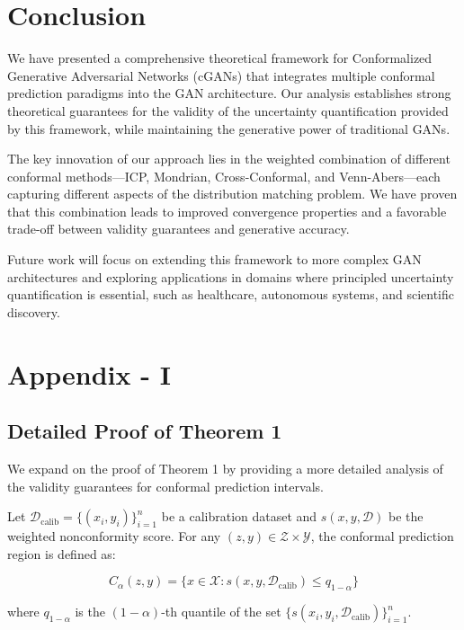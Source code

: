 \documentclass{article}
\theoremstyle{plain}
\theoremstyle{definition}
\theoremstyle{remark}
\begin{document}
\section{Conclusion}
We have presented a comprehensive theoretical framework for Conformalized Generative Adversarial Networks (cGANs) that integrates multiple conformal prediction paradigms into the GAN architecture. Our analysis establishes strong theoretical guarantees for the validity of the uncertainty quantification provided by this framework, while maintaining the generative power of traditional GANs.

The key innovation of our approach lies in the weighted combination of different conformal methods—ICP, Mondrian, Cross-Conformal, and Venn-Abers—each capturing different aspects of the distribution matching problem. We have proven that this combination leads to improved convergence properties and a favorable trade-off between validity guarantees and generative accuracy.

Future work will focus on extending this framework to more complex GAN architectures and exploring applications in domains where principled uncertainty quantification is essential, such as healthcare, autonomous systems, and scientific discovery.

\section{Appendix - I}

\subsection{Detailed Proof of Theorem 1}

We expand on the proof of Theorem 1 by providing a more detailed analysis of the validity guarantees for conformal prediction intervals.

Let $\mathcal{D}_{\text{calib}} = \{(x_i, y_i)\}_{i=1}^n$ be a calibration dataset and $s(x, y, \mathcal{D})$ be the weighted nonconformity score. For any $(z, y) \in \mathcal{Z} \times \mathcal{Y}$, the conformal prediction region is defined as:

\begin{equation}
C_{\alpha}(z, y) = \{x \in \mathcal{X}: s(x, y, \mathcal{D}_{\text{calib}}) \leq q_{1-\alpha}\}
\end{equation}

where $q_{1-\alpha}$ is the $(1-\alpha)$-th quantile of the set $\{s(x_i, y_i, \mathcal{D}_{\text{calib}})\}_{i=1}^n$.
\end{document}
